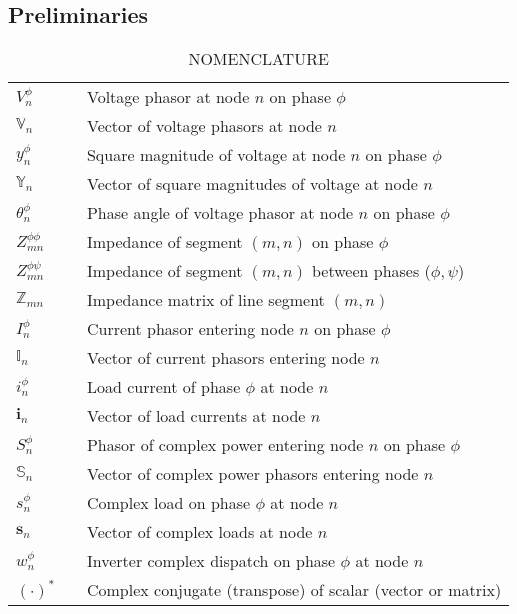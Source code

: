  \subsection{Preliminaries}
 \label{subsec:preliminaries}

\renewcommand{\arraystretch}{1.15}
\setlength{\textfloatsep}{10pt}
\begin{table}[t]
\centering
\caption{NOMENCLATURE}
\begin{tabulary}{\textwidth}{LLL}
	\hline
	\hline
  \noindent $V_{n}^{\phi}$ & & Voltage phasor at node $n$ on phase $\phi$ \\
  \noindent $\mathbb{V}_{n}$ & & Vector of voltage phasors at node $n$ \\
  \noindent $y_{n}^{\phi}$ & & Square magnitude of voltage at node $n$ on phase $\phi$ \\
  \noindent $\mathbb{Y}_{n}$ & & Vector of square magnitudes of voltage at node $n$ \\
  $\theta_{n}^{\phi}$ & & Phase angle of voltage phasor at node $n$ on phase $\phi$ \\
  \noindent $Z_{mn}^{\phi \phi}$ & & Impedance of segment $(m,n)$ on phase $\phi$ \\
  \noindent $Z_{mn}^{\phi \psi}$ & & Impedance of segment $(m,n)$ between phases ($\phi,\psi$) \\
  \noindent $\mathbb{Z}_{mn}$ & & Impedance matrix of line segment $(m,n)$ \\
  \noindent $I_{n}^{\phi}$ & & Current phasor entering node $n$ on phase $\phi$ \\
  \noindent $\mathbb{I}_{n}$ & & Vector of current phasors entering node $n$ \\
  \noindent $i_{n}^{\phi}$ & & Load current of phase $\phi$ at node $n$ \\
  \noindent $\mathbf{i}_{n}$ & & Vector of load currents at node $n$ \\
  \noindent $S_{n}^{\phi}$ & & Phasor of complex power entering node $n$ on phase $\phi$ \\
  \noindent $\mathbb{S}_{n}$ & & Vector of complex power phasors entering node $n$ \\
  \noindent $s_{n}^{\phi}$ & & Complex load on phase $\phi$ at node $n$ \\
  \noindent $\mathbf{s}_{n}$ & & Vector of complex loads at node $n$ \\
  \noindent $w_{n}^{\phi}$ & & Inverter complex dispatch on phase $\phi$ at node $n$ \\
  \noindent $\left( \cdot \right)^{*}$ & & Complex conjugate (transpose) of scalar (vector or matrix) \\
  \hline
  \hline
\end{tabulary}
\end{table}

